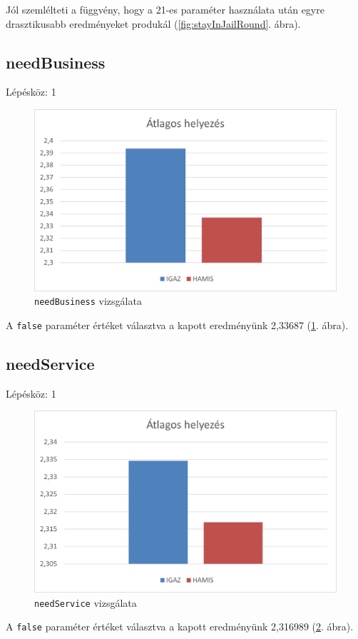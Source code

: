 Jól szemlélteti a függvény, hogy a 21-es paraméter használata után egyre drasztikusabb eredményeket produkál (\ref{fig:stayInJailRound}. ábra).

\subsection{needBusiness}

Lépésköz: 1
\begin{figure}[h!]
\centering
\includegraphics[scale=0.2]{images/bbbbbb.png}
\caption{\texttt{needBusiness} vizsgálata}
\label{fig:needBusiness}
\end{figure}

A \texttt{false} paraméter értéket választva a kapott eredményünk 2,33687 (\ref{fig:needBusiness}. ábra).

\subsection{needService}

Lépésköz: 1
\begin{figure}[h!]
\centering
\includegraphics[scale=0.2]{images/ccvv.png}
\caption{\texttt{needService} vizsgálata}
\label{fig:needService}
\end{figure}

A \texttt{false} paraméter értéket választva a kapott eredményünk 2,316989 (\ref{fig:needService}. ábra).
